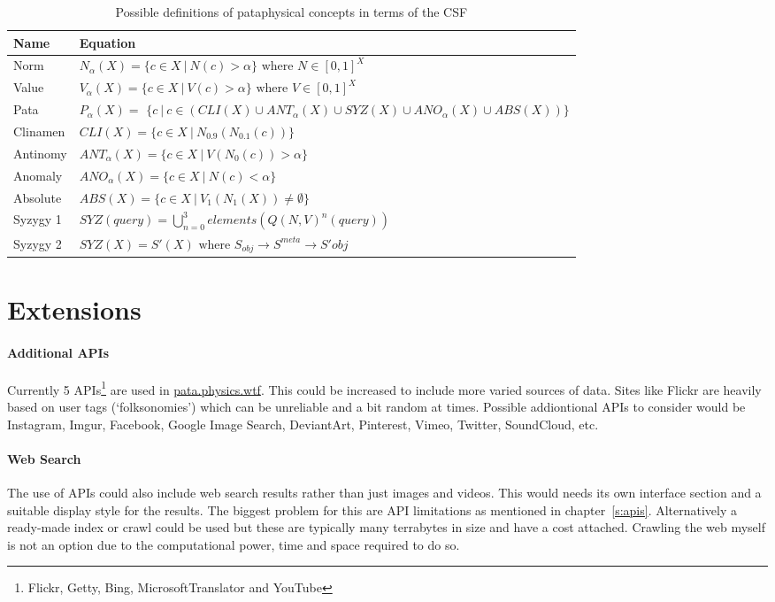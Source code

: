\begin{table}[!htbp]
\centering
\caption[CSF pataphysical concepts]{Possible definitions of pataphysical concepts in terms of the CSF}
\label{tab:patacsf}
\begin{tabu}{XX[5]} 
\toprule
\textbf{Name} & \textbf{Equation} \\
\midrule
Norm & $N_\alpha (X) = \{c \in X \ | \ N(c)> \alpha\} \text{ where } N \in [0,1]^X$ \\
Value & $V_\alpha(X) = \{c \in X \ | \ V(c) > \alpha\} \text{ where } V \in [0,1]^X$ \\
Pata & $P_\alpha(X) = $ \newline $\{c \ | \ c \in(CLI(X)\cup ANT_\alpha(X) \cup SYZ(X) \cup ANO_\alpha(X) \cup ABS(X))\}$ \\
Clinamen & $CLI(X) = \{c \in X \ | \ N_{0.9} (N_{0.1} (c))\}$ \\
Antinomy & $ANT_\alpha(X) = \{c \in X \ | \ V(N_0(c)) > \alpha\}$ \\
Anomaly & $ANO_\alpha(X) = \{c \in X \ | \ N(c)< \alpha\}$ \\
Absolute & $ABS(X) = \{c \in X \ | \ V_1 (N_1 (X)) \neq \emptyset\}$ \\
Syzygy 1 & $SYZ(query) = \bigcup_{n=0}^{3} elements(Q(N,V)^n (query))$ \\
Syzygy 2 & $SYZ(X) = S'(X) \text{ where } S_{obj} \rightarrow S^{meta} \rightarrow S'{obj}$ \\
\bottomrule
\end{tabu}
\end{table}


\section{Extensions}

\paragraph{Additional APIs} 
Currently 5 \ac{API}s\footnote{Flickr, Getty, Bing, MicrosoftTranslator and YouTube} are used in \url{pata.physics.wtf}. This could be increased to include more varied sources of data. Sites like Flickr are heavily based on user tags (`folksonomies') which can be unreliable and a bit random at times. Possible addiontional \ac{API}s to consider would be Instagram, Imgur, Facebook, Google Image Search, DeviantArt, Pinterest, Vimeo, Twitter, SoundCloud, etc.

\paragraph{Web Search} 
The use of \ac{API}s could also include web search results rather than just images and videos. This would needs its own interface section and a suitable display style for the results. The biggest problem for this are \ac{API} limitations as mentioned in chapter~\ref{s:apis}. Alternatively a ready-made index or crawl could be used but these are typically many terrabytes in size and have a cost attached. Crawling the web myself is not an option due to the computational power, time and space required to do so.

